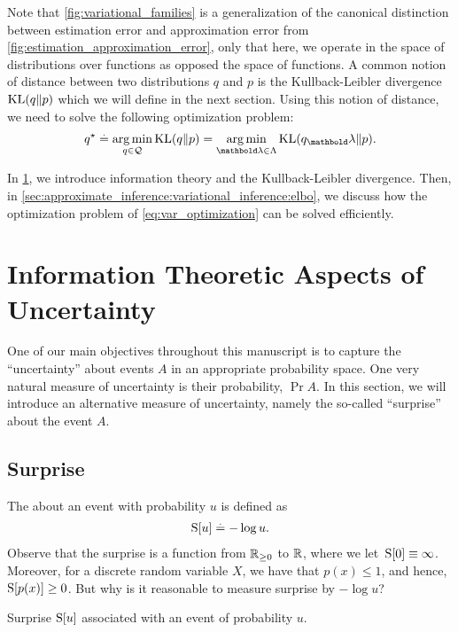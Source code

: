 Note that \cref{fig:variational_families} is a generalization of the canonical distinction between estimation error and approximation error from \cref{fig:estimation_approximation_error}, only that here, we operate in the space of distributions over functions as opposed the space of functions.
A common notion of distance between two distributions $q$ and $p$ is the Kullback-Leibler divergence $\KL{q}{p}$ which we will define in the next section.
Using this notion of distance, we need to solve the following optimization problem: \begin{align}
  \qs \defeq \argmin_{q \in \spQ} \KL{q}{p} = \argmin_{\vlambda \in \Lambda} \KL{q_\vlambda}{p}. \label{eq:var_optimization}
\end{align}

In \cref{sec:approximate_inference:information_theory}, we introduce information theory and the Kullback-Leibler divergence.
Then, in \cref{sec:approximate_inference:variational_inference:elbo}, we discuss how the optimization problem of \cref{eq:var_optimization} can be solved efficiently.

\section{Information Theoretic Aspects of Uncertainty}\label{sec:approximate_inference:information_theory}

One of our main objectives throughout this manuscript is to capture the ``uncertainty'' about events $A$ in an appropriate probability space.
One very natural measure of uncertainty is their probability, $\Pr{A}$.
In this section, we will introduce an alternative measure of uncertainty, namely the so-called ``surprise'' about the event $A$.

\subsection{Surprise}

The  about an event with probability $u$ is defined as \begin{align}
  \S{u} \defeq - \log u.
\end{align}
Observe that the surprise is a function from $\mathbb{R}_{\geq 0}$ to $\mathbb{R}$, where we let~${\S{0} \equiv \infty}$.
Moreover, for a discrete random variable $X$, we have that $p(x) \leq 1$, and hence, $\S{p(x)} \geq 0$.
But why is it reasonable to measure surprise by $- \log u$?

\begin{marginfigure}[-4\baselineskip]
  \caption{Surprise $\S{u}$ associated with an event of probability $u$.}
\end{marginfigure}


